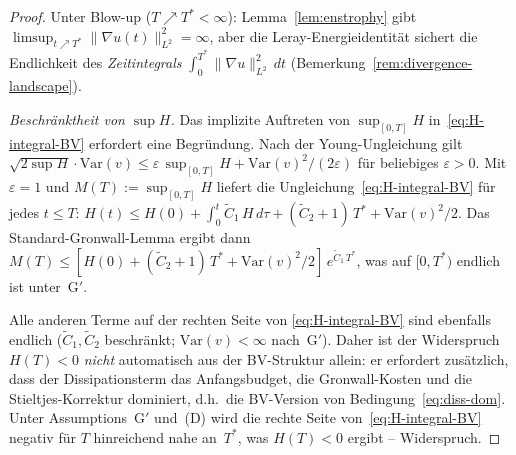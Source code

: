\documentclass[12pt,a4paper]{article}
\theoremstyle{definition}
\theoremstyle{plain}
\theoremstyle{remark}
\begin{document}
\begin{proof}
Unter Blow-up ($T \nearrow T^* < \infty$):
Lemma~\ref{lem:enstrophy} gibt
$\limsup_{t\nearrow T^*}\|\nabla u(t)\|_{L^2}^2=\infty$, aber die
Leray-Energieidentität sichert die Endlichkeit des \emph{Zeitintegrals}
$\int_0^{T^*}\|\nabla u\|_{L^2}^2\,dt$
(Bemerkung~\ref{rem:divergence-landscape}).

\emph{Beschränktheit von $\sup H$.}\;
Das implizite Auftreten von $\sup_{[0,T]} H$ in~\eqref{eq:H-integral-BV}
erfordert eine Begründung. Nach der Young-Ungleichung gilt
$\sqrt{2\sup H}\cdot\mathrm{Var}(v)
\le \varepsilon\,\sup_{[0,T]} H + \mathrm{Var}(v)^2/(2\varepsilon)$
für beliebiges $\varepsilon > 0$.
Mit $\varepsilon = 1$ und $M(T) := \sup_{[0,T]} H$ liefert
die Ungleichung~\eqref{eq:H-integral-BV} für jedes $t \le T$:
$H(t) \le H(0) + \int_0^t \widetilde{C}_1\,H\,d\tau
+ (\widetilde{C}_2+1)\,T^* + \mathrm{Var}(v)^2/2$.
Das Standard-Gronwall-Lemma ergibt dann
$M(T) \le [H(0) + (\widetilde{C}_2+1)\,T^*
+ \mathrm{Var}(v)^2/2]\,e^{\widetilde{C}_1\,T^*}$,
was auf $[0,T^*)$ endlich ist unter~G$'$.

Alle anderen Terme auf der rechten Seite von
\eqref{eq:H-integral-BV} sind ebenfalls endlich
($\widetilde{C}_1, \widetilde{C}_2$ beschränkt;
$\mathrm{Var}(v) < \infty$ nach~G$'$).
Daher ist der Widerspruch $H(T) < 0$ \emph{nicht} automatisch aus der
BV-Struktur allein: er erfordert zusätzlich, dass der Dissipationsterm
das Anfangsbudget, die Gronwall-Kosten und die Stieltjes-Korrektur dominiert,
d.h.\ die BV-Version von Bedingung~\eqref{eq:diss-dom}.
Unter Assumptions~G$'$ und~(D) wird die rechte Seite
von~\eqref{eq:H-integral-BV} negativ für $T$ hinreichend nahe
an~$T^*$, was $H(T) < 0$ ergibt -- Widerspruch.
\end{proof}
\end{document}

